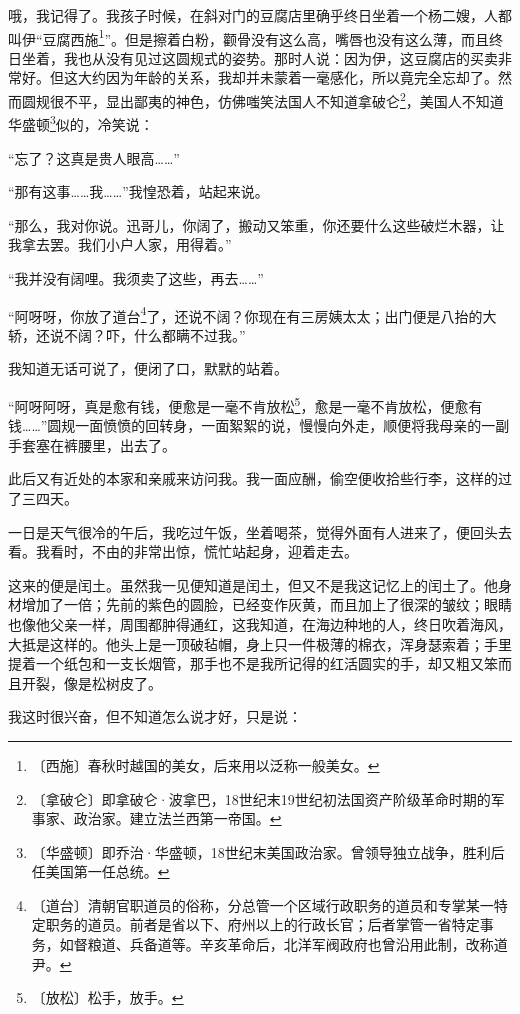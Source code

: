 \documentclass[12pt,UTF-8,openany]{ctexbook}
\begin{document}
\begin{normalsize}
    哦，我记得了。我孩子时候，在斜对门的豆腐店里确乎终日坐着一个杨二嫂，人都叫伊“豆腐西施\footnote{〔西施〕春秋时越国的美女，后来用以泛称一般美女。}”。但是擦着白粉，颧骨没有这么高，嘴唇也没有这么薄，而且终日坐着，我也从没有见过这圆规式的姿势。那时人说：因为伊，这豆腐店的买卖非常好。但这大约因为年龄的关系，我却并未蒙着一毫感化，所以竟完全忘却了。然而圆规很不平，显出鄙夷的神色，仿佛嗤笑法国人不知道拿破仑\footnote{〔拿破仑〕即拿破仑·波拿巴，18世纪末19世纪初法国资产阶级革命时期的军事家、政治家。建立法兰西第一帝国。}，美国人不知道华盛顿\footnote{〔华盛顿〕即乔治·华盛顿，18世纪末美国政治家。曾领导独立战争，胜利后任美国第一任总统。}似的，冷笑说：
    
    “忘了？这真是贵人眼高……”
    
    “那有这事……我……”我惶恐着，站起来说。
    
    “那么，我对你说。迅哥儿，你阔了，搬动又笨重，你还要什么这些破烂木器，让我拿去罢。我们小户人家，用得着。”
    
    “我并没有阔哩。我须卖了这些，再去……”
    
    “阿呀呀，你放了道台\footnote{〔道台〕清朝官职道员的俗称，分总管一个区域行政职务的道员和专掌某一特定职务的道员。前者是省以下、府州以上的行政长官；后者掌管一省特定事务，如督粮道、兵备道等。辛亥革命后，北洋军阀政府也曾沿用此制，改称道尹。}了，还说不阔？你现在有三房姨太太；出门便是八抬的大轿，还说不阔？吓，什么都瞒不过我。”
    
    我知道无话可说了，便闭了口，默默的站着。
    
    “阿呀阿呀，真是愈有钱，便愈是一毫不肯放松\footnote{〔放松〕松手，放手。}，愈是一毫不肯放松，便愈有钱……”圆规一面愤愤的回转身，一面絮絮的说，慢慢向外走，顺便将我母亲的一副手套塞在裤腰里，出去了。
    
    此后又有近处的本家和亲戚来访问我。我一面应酬，偷空便收拾些行李，这样的过了三四天。
    
    一日是天气很冷的午后，我吃过午饭，坐着喝茶，觉得外面有人进来了，便回头去看。我看时，不由的非常出惊，慌忙站起身，迎着走去。
    
    这来的便是闰土。虽然我一见便知道是闰土，但又不是我这记忆上的闰土了。他身材增加了一倍；先前的紫色的圆脸，已经变作灰黄，而且加上了很深的皱纹；眼睛也像他父亲一样，周围都肿得通红，这我知道，在海边种地的人，终日吹着海风，大抵是这样的。他头上是一顶破毡帽，身上只一件极薄的棉衣，浑身瑟索着；手里提着一个纸包和一支长烟管，那手也不是我所记得的红活圆实的手，却又粗又笨而且开裂，像是松树皮了。
    
    我这时很兴奋，但不知道怎么说才好，只是说：
    

\end{normalsize}
\end{document}

